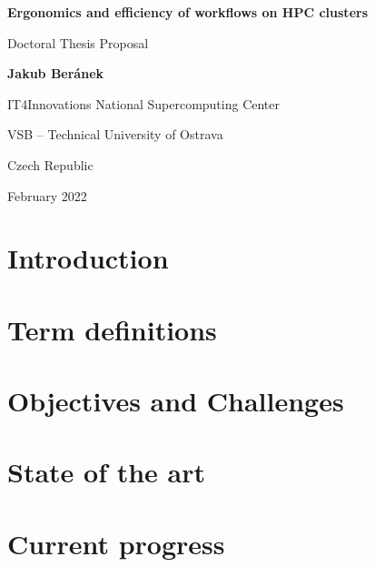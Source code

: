 \documentclass[11pt]{article}
\begin{document}
\begin{titlepage}
    \begin{center}
        \vspace*{1cm}
        \par
        \Huge
        \textbf{Ergonomics and efficiency of workflows on HPC clusters}
        \par
        \vspace{0.5cm}
        \LARGE
        Doctoral Thesis Proposal
        \par
        \vspace{1.5cm}
        \par
        \textbf{Jakub Beránek}
        \par
        \vspace{9.cm}
        \par
        {
            \Large
            IT4Innovations National Supercomputing Center\par
            VSB -- Technical University of Ostrava\par
            Czech Republic\par
            February 2022
        }
    \end{center}
\end{titlepage}

\tableofcontents
\clearpage

\section{Introduction}
\label{sec:introduction}


\section{Term definitions}
\label{sec:task_graph_definition}


\section{Objectives and Challenges}
\label{sec:challenges}


\section{State of the art}
\label{sec:state_of_the_art}


\section{Current progress}
\label{sec:current_progress}

\end{document}
